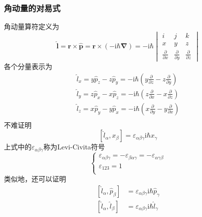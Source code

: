 \subsubsection{角动量的对易式}
角动量算符定义为
$$
    \hat{\boldsymbol{l}} = \boldsymbol{r} \times \hat{\boldsymbol{p}}
    =\boldsymbol{r}\times\left(-\mathrm{i}\hbar\boldsymbol{\nabla}\right)
    =-\mathrm{i}\hbar\begin{vmatrix}
        i                            & j                            & k                            \\
        x                            & y                            & z                            \\
        \frac{\partial }{\partial x} & \frac{\partial }{\partial y} & \frac{\partial }{\partial z}
    \end{vmatrix}
$$
各个分量表示为
$$
    \begin{aligned}
        \hat{l}_{x} = y\hat{p}_z-z\hat{p}_y = -\mathrm{i}\hbar\left(y\frac{\partial }{\partial z} - z\frac{\partial }{\partial y}\right) \\
        \hat{l}_{y} = z\hat{p}_x-x\hat{p}_z = -\mathrm{i}\hbar\left(z\frac{\partial }{\partial x} - x\frac{\partial }{\partial z}\right) \\
        \hat{l}_{z} = x\hat{p}_y-y\hat{p}_x = -\mathrm{i}\hbar\left(x\frac{\partial }{\partial y} - y\frac{\partial }{\partial x}\right) \\
    \end{aligned}
$$
不难证明
\begin{equation}
    \left[\hat{l}_{\alpha}, x_{\beta}\right] = \varepsilon_{\alpha\beta\gamma}\mathrm{i}\hbar x_{\gamma}
\end{equation}
上式中的$\varepsilon_{\alpha\beta\gamma}$称为Levi-Civita符号
\begin{equation}\label{levi-civita}
    \begin{cases}
        \varepsilon_{\alpha\beta\gamma} = -\varepsilon_{\beta\alpha\gamma} = -\varepsilon_{\alpha\gamma\beta} \\
        \varepsilon_{123} = 1                                                                                 \\
    \end{cases}
\end{equation}
类似地，还可以证明
\begin{align}
    \left[\hat{l}_{\alpha}, \hat{p}_{\beta}\right] & = \varepsilon_{\alpha\beta\gamma}\mathrm{i}\hbar\hat{p}_{\gamma} \\
    \left[\hat{l}_{\alpha}, \hat{l}_{\beta}\right] & = \varepsilon_{\alpha\beta\gamma}\mathrm{i}\hbar\hat{l}_{\gamma}
\end{align}


